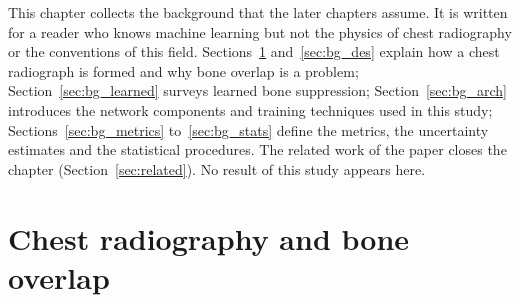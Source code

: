 This chapter collects the background that the later chapters assume. It is written for a reader who knows machine learning but not the physics
of chest radiography or the conventions of this field. Sections~\ref{sec:bg_cxr} and~\ref{sec:bg_des} explain how a chest radiograph is formed
and why bone overlap is a problem; Section~\ref{sec:bg_learned} surveys learned bone suppression; Section~\ref{sec:bg_arch} introduces the network
components and training techniques used in this study; Sections~\ref{sec:bg_metrics} to~\ref{sec:bg_stats} define the metrics, the uncertainty
estimates and the statistical procedures. The related work of the paper closes the chapter (Section~\ref{sec:related}). No result of this study
appears here.

\section{Chest radiography and bone overlap}
\label{sec:bg_cxr}
